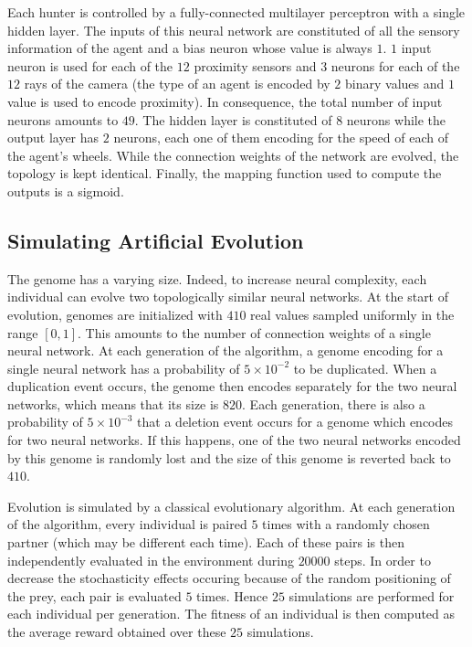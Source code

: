     Each hunter is controlled by a fully-connected multilayer perceptron with a single hidden layer. The inputs of this neural network are constituted of all the sensory information of the agent and a bias neuron whose value is always $1$. $1$ input neuron is used for each of the $12$ proximity sensors and $3$ neurons for each of the $12$ rays of the camera (the type of an agent is encoded by $2$ binary values and $1$ value is used to encode proximity). In consequence, the total number of input neurons amounts to $49$. The hidden layer is constituted of $8$ neurons while the output layer has $2$ neurons, each one of them encoding for the speed of each of the agent's wheels. While the connection weights of the network are evolved, the topology is kept identical. Finally, the mapping function used to compute the outputs is a sigmoid.


  \subsection{Simulating Artificial Evolution}
    The genome has a varying size. Indeed, to increase neural complexity, each individual can evolve two topologically similar neural networks. At the start of evolution, genomes are initialized with $410$ real values sampled uniformly in the range \([0,1]\). This amounts to the number of connection weights of a single neural network. At each generation of the algorithm, a genome encoding for a single neural network has a probability of \(5 \times 10^{-2}\) to be duplicated. When a duplication event occurs, the genome then encodes separately for the two neural networks, which means that its size is $820$. Each generation, there is also a probability of \(5 \times 10^{-3}\) that a deletion event occurs for a genome which encodes for two neural networks. If this happens, one of the two neural networks encoded by this genome is randomly lost and the size of this genome is reverted back to $410$.

    Evolution is simulated by a classical evolutionary algorithm. At each generation of the algorithm, every individual is paired $5$ times with a randomly chosen partner (which may be different each time). Each of these pairs is then independently evaluated in the environment during $20000$ steps. In order to decrease the stochasticity effects occuring because of the random positioning of the prey, each pair is evaluated $5$ times. Hence $25$ simulations are performed for each individual per generation. The fitness of an individual is then computed as the average reward obtained over these $25$ simulations.

